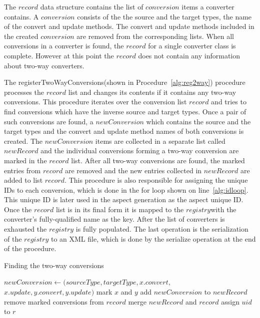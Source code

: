 The $record$ data structure contains the list of $conversion$ items a converter contains. A $conversion$ consists of the the source and the target types, the name of the convert and update methods. 
The convert and update methods included in the created $conversion$ are removed from the corresponding lists. 
When all conversions in a converter is found, the $record$ for a single converter class is complete. 
However at this point the $record$ does not contain any information about two-way converters.

The registerTwoWayConversions(shown in Procedure~\ref{alg:reg2way}) procedure processes the $record$ list and changes its contents if it contains any two-way conversions.
This procedure iterates over the conversion list $record$ and tries to find conversions which have the inverse source and target types. 
Once a pair of such conversions are found, a $newConversion$ which contains the source and the target types and the convert and update method names of both conversions is created. 
The $newConversion$ items are collected in a separate list called $newRecord$ and the individual conversions forming a two-way conversion are marked in the $record$ list. 
After all two-way conversions are found, the marked entries from $record$ are removed and the new entries collected in $newRecord$ are added to list $record$. 
This procedure is also responsible for assigning the unique IDs to each conversion, which is done in the for loop shown on line~\ref{alg:idloop}.
This unique ID is later used in the aspect generation as the aspect unique ID. 
Once the $record$ list is in its final form it is mapped to the $registry$with the converter's fully-qualified name as the key. 
After the list of converters is exhausted the $registry$ is fully populated.
The last operation is the serialization of the $registry$ to an XML file, which is done by the serialize operation at the end of the procedure.

\begin{algorithm}
\caption{Finding the two-way conversions}\label{alg:reg2way}
	\begin{algorithmic}[1]
				\State $newConversion \gets (sourceType, targetType, x.convert,$
				\\\hspace{\algorithmicindent}$ x.update, y.convert, y.update)$
				\State mark $x$ and $y$
				\State add $newConversion$ to $newRecord$
				\EndIf
			\EndIf
		\EndFor
		\EndFor
		\State remove marked conversions from $record$
		\State merge $newRecord$ and $record$
		 \label{alg:idloop}
		\State assign $uid$ to $r$
		\EndFor
		\EndProcedure
	\end{algorithmic}
\end{algorithm}

